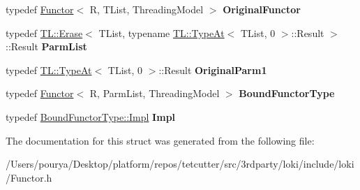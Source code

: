 \begin{DoxyCompactItemize}
\item 
\hypertarget{structLoki_1_1Private_1_1BinderFirstTraits_3_01Functor_3_01R_00_01TList_00_01ThreadingModel_01_4_01_4_a519ca9b564423ed2a9c89413966c554c}{}typedef \hyperlink{classLoki_1_1Functor}{Functor}$<$ R, T\+List, Threading\+Model $>$ {\bfseries Original\+Functor}\label{structLoki_1_1Private_1_1BinderFirstTraits_3_01Functor_3_01R_00_01TList_00_01ThreadingModel_01_4_01_4_a519ca9b564423ed2a9c89413966c554c}

\item 
\hypertarget{structLoki_1_1Private_1_1BinderFirstTraits_3_01Functor_3_01R_00_01TList_00_01ThreadingModel_01_4_01_4_ae5cab081803c81ce7bc33134327886f4}{}typedef \hyperlink{structLoki_1_1TL_1_1Erase}{T\+L\+::\+Erase}$<$ T\+List, typename \hyperlink{structLoki_1_1TL_1_1TypeAt}{T\+L\+::\+Type\+At}$<$ T\+List, 0 $>$\+::Result $>$\+::Result {\bfseries Parm\+List}\label{structLoki_1_1Private_1_1BinderFirstTraits_3_01Functor_3_01R_00_01TList_00_01ThreadingModel_01_4_01_4_ae5cab081803c81ce7bc33134327886f4}

\item 
\hypertarget{structLoki_1_1Private_1_1BinderFirstTraits_3_01Functor_3_01R_00_01TList_00_01ThreadingModel_01_4_01_4_a3008f50ed66cd74fde247334760e9100}{}typedef \hyperlink{structLoki_1_1TL_1_1TypeAt}{T\+L\+::\+Type\+At}$<$ T\+List, 0 $>$\+::Result {\bfseries Original\+Parm1}\label{structLoki_1_1Private_1_1BinderFirstTraits_3_01Functor_3_01R_00_01TList_00_01ThreadingModel_01_4_01_4_a3008f50ed66cd74fde247334760e9100}

\item 
\hypertarget{structLoki_1_1Private_1_1BinderFirstTraits_3_01Functor_3_01R_00_01TList_00_01ThreadingModel_01_4_01_4_abe4c4354e2e146b37f2c052b6be181cd}{}typedef \hyperlink{classLoki_1_1Functor}{Functor}$<$ R, Parm\+List, Threading\+Model $>$ {\bfseries Bound\+Functor\+Type}\label{structLoki_1_1Private_1_1BinderFirstTraits_3_01Functor_3_01R_00_01TList_00_01ThreadingModel_01_4_01_4_abe4c4354e2e146b37f2c052b6be181cd}

\item 
\hypertarget{structLoki_1_1Private_1_1BinderFirstTraits_3_01Functor_3_01R_00_01TList_00_01ThreadingModel_01_4_01_4_adbe3dbbc5d43e821c572bd049800084f}{}typedef \hyperlink{classLoki_1_1FunctorImpl}{Bound\+Functor\+Type\+::\+Impl} {\bfseries Impl}\label{structLoki_1_1Private_1_1BinderFirstTraits_3_01Functor_3_01R_00_01TList_00_01ThreadingModel_01_4_01_4_adbe3dbbc5d43e821c572bd049800084f}

\end{DoxyCompactItemize}


The documentation for this struct was generated from the following file\+:\begin{DoxyCompactItemize}
\item 
/\+Users/pourya/\+Desktop/platform/repos/tetcutter/src/3rdparty/loki/include/loki/Functor.\+h\end{DoxyCompactItemize}
